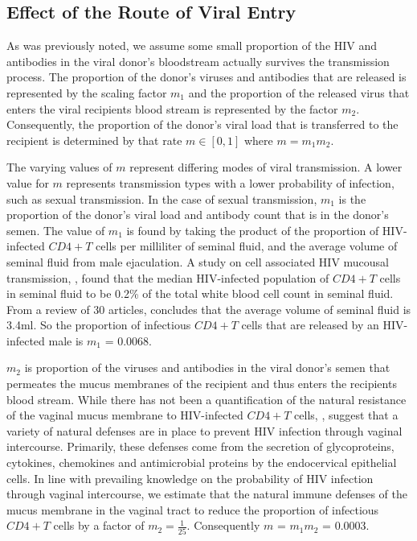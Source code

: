 \documentclass[]{elsarticle}
\theoremstyle{definition}
\begin{document}
\subsection{Effect of the Route of Viral Entry}

As was previously noted, we assume some small proportion of the HIV and antibodies in the viral donor's bloodstream actually survives the transmission process. The proportion of the donor's viruses and antibodies that are released is represented by the scaling factor $m_1$ and the proportion of the released virus that enters the viral recipients blood stream is represented by the factor $m_2$. Consequently, the proportion of the donor's viral load that is transferred to the recipient is determined by that rate $m \in [0, 1]$ where $m=m_1m_2.$

The varying values of $m$ represent differing modes of viral transmission. A lower value for $m$ represents transmission types with a lower probability of infection, such as sexual transmission. In the case of sexual transmission, $m_1$ is the proportion of the donor's viral load and antibody count that is in the donor's semen. The value of $m_1$ is found by taking the product of the proportion of HIV-infected $CD4+T$ cells per milliliter of seminal fluid, and the average volume of seminal fluid from male ejaculation. A study on cell associated HIV mucousal transmission,  \cite{anderson2010} \cite{Xu1997}, found that the median HIV-infected population of $CD4+T$ cells in seminal fluid to be 0.2\% of the total white blood cell count in seminal fluid. From a review of 30 articles, \cite{Xu1997} concludes that the average volume of seminal fluid is 3.4ml. So the proportion of infectious $CD4+T$ cells that are released by an HIV-infected male is $m_1$ = 0.0068.

$m_2$ is proportion of the viruses and antibodies in the viral donor's semen that permeates the mucus membranes of the recipient and thus enters the recipients blood stream. While there has not been a quantification of the natural resistance of the vaginal mucus membrane to HIV-infected $CD4+T$ cells, \cite{Wira2015}\cite{Cutler2008}\cite{Tebit2012}, suggest that a variety of natural defenses are in place to prevent HIV infection through vaginal intercourse. Primarily, these defenses come from the secretion of glycoproteins, cytokines, chemokines and antimicrobial proteins by the endocervical epithelial cells. In line with prevailing knowledge on the probability of HIV infection through vaginal intercourse, we estimate that the natural immune defenses of the mucus membrane in the vaginal tract to reduce the proportion of infectious $CD4+T$ cells by a factor of $m_2 = \frac{1}{25}$. Consequently $m$ = $m_1 m_2$ = 0.0003.
\end{document}
